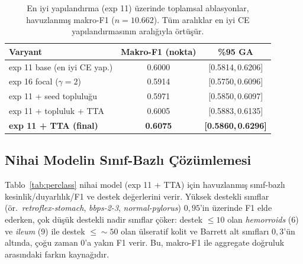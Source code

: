 \begin{table}[H]
\centering
\caption{En iyi yapılandırma (exp 11) üzerinde toplamsal ablasyonlar, havuzlanmış
makro-F1 ($n=10{.}662$). Tüm aralıklar en iyi CE yapılandırmasının aralığıyla
örtüşür.}
\label{tab:week35}
\begin{tabular}{l c c}
\toprule
Varyant & Makro-F1 (nokta) & \%95 GA \\
\midrule
exp 11 base (en iyi CE yap.)   & 0.6000 & [0.5814,\,0.6206] \\
exp 16 focal ($\gamma{=}2$)    & 0.5914 & [0.5750,\,0.6096] \\
exp 11 + seed topluluğu        & 0.5971 & [0.5850,\,0.6097] \\
exp 11 + topluluk + TTA        & 0.6005 & [0.5883,\,0.6135] \\
\textbf{exp 11 + TTA (final)}  & \textbf{0.6075} & \textbf{[0.5860,\,0.6296]} \\
\bottomrule
\end{tabular}
\end{table}

\subsection{Nihai Modelin Sınıf-Bazlı Çözümlemesi}
\label{subsec:t3}
Tablo~\ref{tab:perclass} nihai model (exp 11 + TTA) için havuzlanmış
sınıf-bazlı kesinlik/duyarlılık/F1 ve destek değerlerini verir. Yüksek destekli
sınıflar (ör.\ \textit{retroflex-stomach}, \textit{bbps-2-3},
\textit{normal-pylorus}) $0{,}95$'in üzerinde F1 elde ederken, çok düşük
destekli nadir sınıflar çöker: destek $\le 10$ olan \textit{hemorroids} (6) ve
\textit{ileum} (9) ile destek $\le \!\sim\!50$ olan ülseratif kolit ve Barrett
alt sınıfları $0{,}3$'ün altında, çoğu zaman $0$'a yakın F1 verir. Bu, makro-F1
ile aggregate doğruluk arasındaki farkın kaynağıdır.

